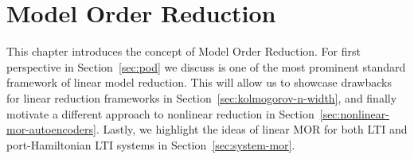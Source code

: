 \chapter{Model Order Reduction}\label{chap:model-order-reduction}


This chapter introduces the concept of Model Order Reduction.
For first perspective in Section~\ref{sec:pod} we discuss is one of the most prominent standard framework of linear model reduction.
This will allow us to showcase drawbacks for linear reduction frameworks in Section~\ref{sec:kolmogorov-n-width}, and finally motivate a different approach to nonlinear reduction in Section~\ref{sec:nonlinear-mor-autoencoders}.
Lastly, we highlight the ideas of linear MOR for both LTI and port-Hamiltonian LTI systems in Section~\ref{sec:system-mor}.





